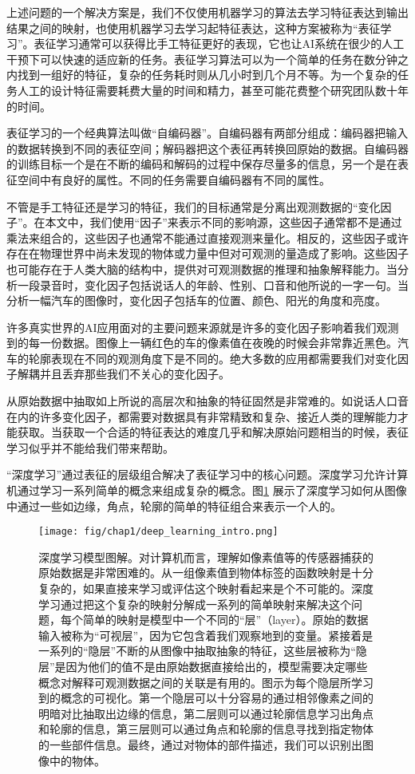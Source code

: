 上述问题的一个解决方案是，我们不仅使用机器学习的算法去学习特征表达到输出结果之间的映射，也使用机器学习去学习起特征表达，这种方案被称为“表征学习”。表征学习通常可以获得比手工特征更好的表现，它也让AI系统在很少的人工干预下可以快速的适应新的任务。表征学习算法可以为一个简单的任务在数分钟之内找到一组好的特征，复杂的任务耗时则从几小时到几个月不等。为一个复杂的任务人工的设计特征需要耗费大量的时间和精力，甚至可能花费整个研究团队数十年的时间。


表征学习的一个经典算法叫做“自编码器”。自编码器有两部分组成：编码器把输入的数据转换到不同的表征空间；解码器把这个表征再转换回原始的数据。自编码器的训练目标一个是在不断的编码和解码的过程中保存尽量多的信息，另一个是在表征空间中有良好的属性。不同的任务需要自编码器有不同的属性。


不管是手工特征还是学习的特征，我们的目标通常是分离出观测数据的“变化因子”。在本文中，我们使用“因子”来表示不同的影响源，这些因子通常都不是通过乘法来组合的，这些因子也通常不能通过直接观测来量化。相反的，这些因子或许存在在物理世界中尚未发现的物体或力量中但对可观测的量造成了影响。这些因子也可能存在于人类大脑的结构中，提供对可观测数据的推理和抽象解释能力。当分析一段录音时，变化因子包括说话人的年龄、性别、口音和他所说的一字一句。当分析一幅汽车的图像时，变化因子包括车的位置、颜色、阳光的角度和亮度。


许多真实世界的AI应用面对的主要问题来源就是许多的变化因子影响着我们观测到的每一份数据。图像上一辆红色的车的像素值在夜晚的时候会非常靠近黑色。汽车的轮廓表现在不同的观测角度下是不同的。绝大多数的应用都需要我们对变化因子解耦并且丢弃那些我们不关心的变化因子。


从原始数据中抽取如上所说的高层次和抽象的特征固然是非常难的。如说话人口音在内的许多变化因子，都需要对数据具有非常精致和复杂、接近人类的理解能力才能获取。当获取一个合适的特征表达的难度几乎和解决原始问题相当的时候，表征学习似乎并不能给我们带来帮助。


“深度学习”通过表征的层级组合解决了表征学习中的核心问题。深度学习允许计算机通过学习一系列简单的概念来组成复杂的概念。图\ref{fig:deep_learning_intro} 展示了深度学习如何从图像中通过一些如边缘，角点，轮廓的简单的特征组合来表示一个人的。

\begin{figure}[htbp] %
   \centering
   \texttt{[image: fig/chap1/deep\_learning\_intro.png]} 
   \caption{深度学习模型图解。对计算机而言，理解如像素值等的传感器捕获的原始数据是非常困难的。从一组像素值到物体标签的函数映射是十分复杂的，如果直接来学习或评估这个映射看起来是个不可能的。深度学习通过把这个复杂的映射分解成一系列的简单映射来解决这个问题，每个简单的映射是模型中一个不同的“层”（layer）。原始的数据输入被称为“可视层”，因为它包含着我们观察地到的变量。紧接着是一系列的“隐层”不断的从图像中抽取抽象的特征，这些层被称为“隐层”是因为他们的值不是由原始数据直接给出的，模型需要决定哪些概念对解释可观测数据之间的关联是有用的。图示为每个隐层所学习到的概念的可视化。第一个隐层可以十分容易的通过相邻像素之间的明暗对比抽取出边缘的信息，第二层则可以通过轮廓信息学习出角点和轮廓的信息，第三层则可以通过角点和轮廓的信息寻找到指定物体的一些部件信息。最终，通过对物体的部件描述，我们可以识别出图像中的物体。}
   \label{fig:deep_learning_intro}
\end{figure}


